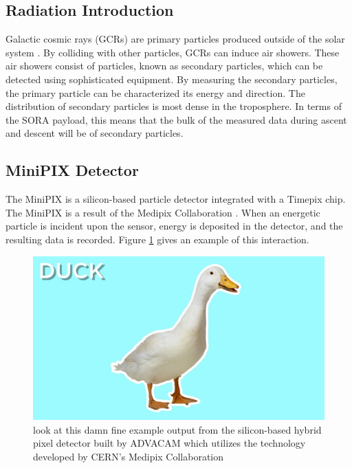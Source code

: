 \subsection{Radiation Introduction}
\label{sec: Radiation Background}

Galactic cosmic rays (GCRs) are primary particles produced outside of the solar system \cite{GCRs}. By colliding with other particles, GCRs can induce air showers. These air showers consist of particles, known as secondary particles, which can be detected using sophisticated equipment. By measuring the secondary particles, the primary particle can be characterized its energy and direction. The distribution of secondary particles \cite{Frank} is most dense in the troposphere. In terms of the SORA payload, this means that the bulk of the measured data during ascent and descent will be of secondary particles.

\subsection{MiniPIX Detector}
The MiniPIX \cite{silicon_sensor} is a silicon-based particle detector integrated with a Timepix \cite{timepix} chip. The MiniPIX is a result of the Medipix Collaboration \cite{medipix}. When an energetic particle is incident upon the sensor, energy is deposited in the detector, and the resulting data is recorded. Figure \ref{fig:MiniPIXExample} gives an example of this interaction.

\begin{figure}[h!]
  \centering
  \includegraphics[width=\textwidth]{figures/duck.jpg}
  \caption{look at this damn fine \tiny example output from the silicon-based hybrid pixel detector built by ADVACAM which utilizes the technology developed by CERN's Medipix Collaboration}
  \label{fig:MiniPIXExample}
 \end{figure}
